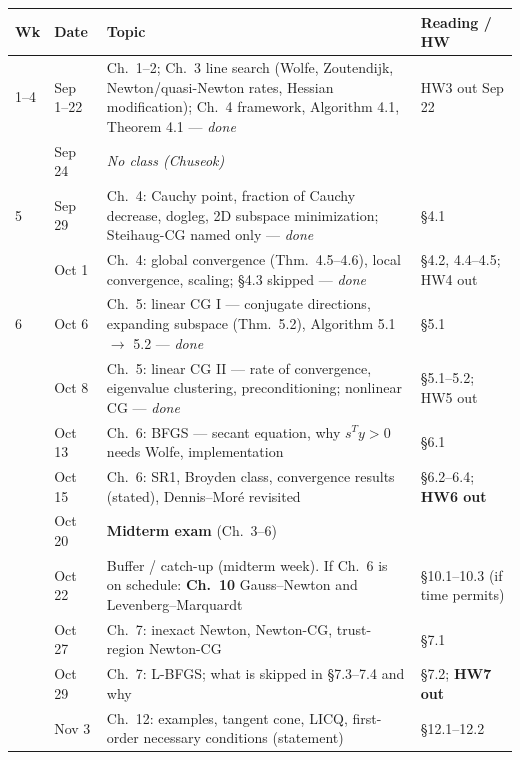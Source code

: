 \documentclass[10pt,a4paper]{article}
\newcommand{\done}[1]{\textcolor{black!45}{#1}}
\newcommand{\hw}[1]{\textbf{#1}}
\begin{document}
\renewcommand{\arraystretch}{1.15}
\begin{longtable}{@{}>{\raggedright\arraybackslash}p{7mm}>{\raggedright\arraybackslash}p{18mm}>{\raggedright\arraybackslash}p{86mm}>{\raggedright\arraybackslash}p{47mm}@{}}
\toprule
\textbf{Wk} & \textbf{Date} & \textbf{Topic} & \textbf{Reading / HW}\\
\midrule
\endhead
\done{1--4} & \done{Sep 1--22} & \done{Ch.~1--2; Ch.~3 line search (Wolfe, Zoutendijk, Newton/quasi-Newton rates,
  Hessian modification); Ch.~4 framework, Algorithm 4.1, Theorem 4.1 --- \emph{done}} & \done{HW3 out Sep 22}\\
4 & Sep 24 & \emph{No class (Chuseok)} & \\
\midrule
\done{5} & \done{Sep 29} & \done{Ch.~4: Cauchy point, fraction of Cauchy decrease, dogleg, 2D subspace
  minimization; Steihaug-CG named only --- \emph{done}} & \done{\S4.1}\\
 & \done{Oct 1} & \done{Ch.~4: global convergence (Thm.~4.5--4.6), local convergence, scaling; \S4.3 skipped
  --- \emph{done}} & \done{\S4.2, 4.4--4.5; HW4 out}\\
\done{6} & \done{Oct 6} & \done{Ch.~5: linear CG I --- conjugate directions, expanding subspace (Thm.~5.2),
  Algorithm 5.1 $\to$ 5.2 --- \emph{done}} & \done{\S5.1}\\
 & \done{Oct 8} & \done{Ch.~5: linear CG II --- rate of convergence, eigenvalue clustering, preconditioning;
  nonlinear CG --- \emph{done}} & \done{\S5.1--5.2; HW5 out}\\
7 & Oct 13 & Ch.~6: BFGS --- secant equation, why $s^{T}y>0$ needs Wolfe, implementation & \S6.1\\
 & Oct 15 & Ch.~6: SR1, Broyden class, convergence results (stated), Dennis--Mor\'e revisited
  & \S6.2--6.4; \hw{HW6 out}\\
\midrule
8 & Oct 20 & \textbf{Midterm exam} (Ch.~3--6) & \\
 & Oct 22 & Buffer / catch-up (midterm week). If Ch.~6 is on schedule: \textbf{Ch.~10} Gauss--Newton and Levenberg--Marquardt & \S10.1--10.3 (if time permits)\\
\midrule
9 & Oct 27 & Ch.~7: inexact Newton, Newton-CG, trust-region Newton-CG & \S7.1\\
 & Oct 29 & Ch.~7: L-BFGS; what is skipped in \S7.3--7.4 and why & \S7.2; \hw{HW7 out}\\
10 & Nov 3 & Ch.~12: examples, tangent cone, LICQ, first-order necessary conditions (statement)
  & \S12.1--12.2\\

\end{longtable}
\end{document}
